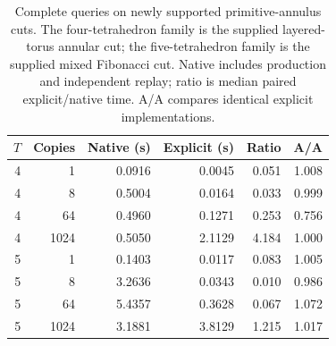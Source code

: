 \begin{table}[htbp]
\centering
\begin{tabular}{rrrrrr}
\toprule
$T$ & Copies & Native (s) & Explicit (s) & Ratio & A/A \\
\midrule
4 & 1 & 0.0916 & 0.0045 & 0.051 & 1.008 \\
4 & 8 & 0.5004 & 0.0164 & 0.033 & 0.999 \\
4 & 64 & 0.4960 & 0.1271 & 0.253 & 0.756 \\
4 & 1024 & 0.5050 & 2.1129 & 4.184 & 1.000 \\
5 & 1 & 0.1403 & 0.0117 & 0.083 & 1.005 \\
5 & 8 & 3.2636 & 0.0343 & 0.010 & 0.986 \\
5 & 64 & 5.4357 & 0.3628 & 0.067 & 1.072 \\
5 & 1024 & 3.1881 & 3.8129 & 1.215 & 1.017 \\
\bottomrule
\end{tabular}
\caption{Complete queries on newly supported primitive-annulus cuts. The
four-tetrahedron family is the supplied layered-torus annular cut; the
five-tetrahedron family is the supplied mixed Fibonacci cut. Native includes
production and independent replay; ratio is median paired explicit/native
time. A/A compares identical explicit implementations.}
\label{marked-cut:primitive-timings}
\end{table}
